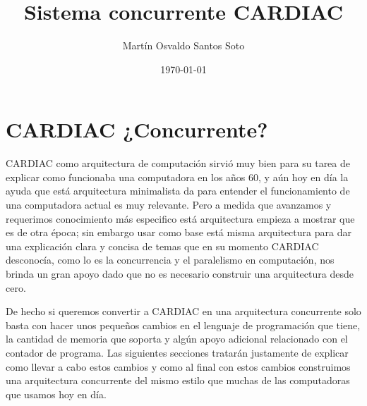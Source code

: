 \documentclass[12pt]{article}
\title{Sistema concurrente CARDIAC}
\author{Martín Osvaldo Santos Soto}
\date{\today}
\begin{document}
	\maketitle


    \section{ CARDIAC ¿Concurrente? }
    
    CARDIAC como arquitectura de computación sirvió muy bien para su tarea de explicar como funcionaba una computadora en los años
    60, y aún hoy en día la ayuda que está arquitectura minimalista da para entender el funcionamiento de una computadora actual es muy relevante. Pero
    a medida que avanzamos y requerimos conocimiento más especifico está arquitectura empieza a mostrar que es de otra época; sin embargo usar
    como base está misma arquitectura para dar una explicación clara y concisa de temas que en su momento CARDIAC desconocía, como lo es la
    concurrencia y el paralelismo en computación, nos brinda un gran apoyo dado que no es necesario construir una arquitectura desde cero.
    
    De hecho si queremos convertir a CARDIAC en una arquitectura concurrente solo basta con hacer unos pequeños cambios en el lenguaje
    de programación que tiene, la cantidad de memoria que soporta y algún apoyo adicional relacionado con el contador de programa. Las siguientes
    secciones tratarán justamente de explicar como llevar a cabo estos cambios y como al final con estos cambios construimos una arquitectura
    concurrente del mismo estilo que muchas de las computadoras que usamos hoy en día.
    

	
	
\end{document}
